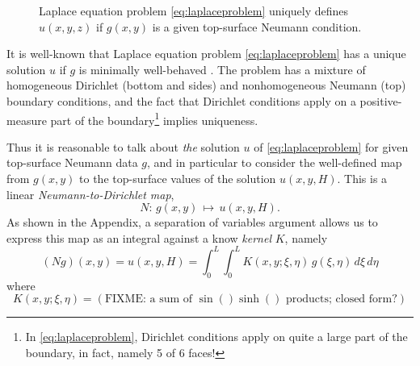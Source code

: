 \documentclass[letterpaper,final,12pt,reqno]{amsart}
\theoremstyle{cstyle}
\theoremstyle{cstyle*}
\theoremstyle{dstyle}
\newcommand{\grad}{\nabla}
\begin{document}
\begin{figure}[ht]
\caption{Laplace equation problem \eqref{eq:laplaceproblem} uniquely defines $u(x,y,z)$ if $g(x,y)$ is a given top-surface Neumann condition.}
\label{fig:laplaceproblem}
\end{figure}

It is well-known that Laplace equation problem \eqref{eq:laplaceproblem} has a unique solution $u$ if $g$ is minimally well-behaved \cite{Elmanetal2014,Evans2010}.  The problem has a mixture of homogeneous Dirichlet (bottom and sides) and nonhomogeneous Neumann (top) boundary conditions, and the fact that  Dirichlet conditions apply on a positive-measure part of the boundary\footnote{In \eqref{eq:laplaceproblem}, Dirichlet conditions apply on quite a large part of the boundary, in fact, namely 5 of 6 faces!} implies uniqueness.

Thus it is reasonable to talk about \emph{the} solution $u$ of \eqref{eq:laplaceproblem} for given top-surface Neumann data $g$, and in particular to consider the well-defined map from $g(x,y)$ to the top-surface values of the solution $u(x,y,H)$.  This is a linear \emph{Neumann-to-Dirichlet map},
\begin{equation}
N : \, g(x,y) \, \mapsto \, u(x,y,H).  \label{eq:ntod}
\end{equation}
As shown in the Appendix, a separation of variables argument allows us to express this map as an integral against a know \emph{kernel} $K$, namely
\begin{equation}
(N g)(x,y) = u(x,y,H) = \int_0^L \int_0^L K(x,y;\xi,\eta)\, g(\xi,\eta)\,d\xi\,d\eta  \label{eq:ntodformula}
\end{equation}
where
\begin{equation}
K(x,y;\xi,\eta) = (\text{FIXME: a sum of $\sin() \sinh()$ products; closed form?})  \label{eq:kernelformula}
\end{equation}
\end{document}
